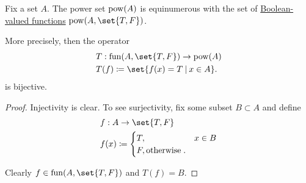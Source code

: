 \begin{lemma}\label{thm:power_set_via_subsets}
  Fix a set \( A \). The power set \( \operatorname{pow}(A) \) is equinumerous with the set of \hyperref[def:boolean_operator]{Boolean-valued functions} \( \pow(A, \set{ T, F }) \).

  More precisely, then the operator
  \begin{equation*}
    \begin{aligned}
      &T: \fun(A, \set{ T, F }) \to \pow(A) \\
      &T(f) \coloneqq \set{ f(x) = T \given x \in A }.
    \end{aligned}
  \end{equation*}
  is bijective.
\end{lemma}
\begin{proof}
  Injectivity is clear. To see surjectivity, fix some subset \( B \subset A \) and define
  \begin{equation*}
    \begin{aligned}
      &f: A \to \set{ T, F } \\
      &f(x) \coloneqq \begin{cases}
        T, &x \in B \\
        F, \T{otherwise}.
      \end{cases}
    \end{aligned}
  \end{equation*}

  Clearly \( f \in \fun(A, \set{ T, F }) \) and \( T(f) = B \).
\end{proof}

